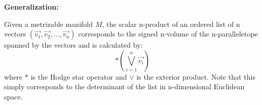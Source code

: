\documentclass{article}
\begin{document}
\textbf{Generalization:}

Given a metrizable manifold $M$, the scalar n-product of an ordered list of n vectors $(\vec{v_1}, \vec{v_2}, \dotsc, \vec{v_n})$ corresponds to the signed n-volume of the n-paralleletope spanned by the vectors and is calculated by:
$$\ast(\bigvee\limits_{i=1}^n\vec{v_i})$$
where $\ast$ is the Hodge star operator and $\vee$ is the exterior product. Note that this simply corresponds to the determinant of the list in n-dimensional Euclidean space.
\end{document}

